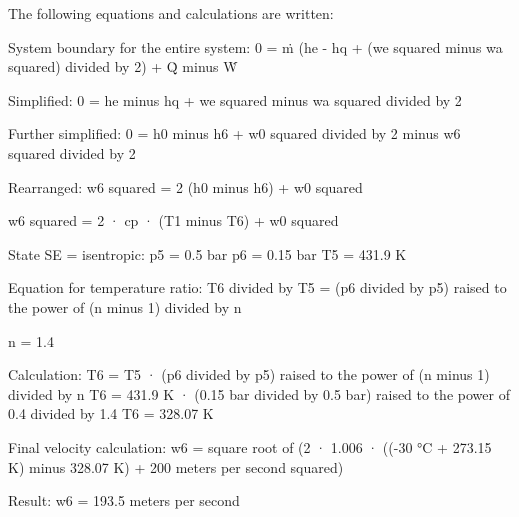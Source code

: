 The following equations and calculations are written:  

System boundary for the entire system:  
0 = ṁ (he - hq + (we squared minus wa squared) divided by 2) + Q̇ minus Ẇ  

Simplified:  
0 = he minus hq + we squared minus wa squared divided by 2  

Further simplified:  
0 = h0 minus h6 + w0 squared divided by 2 minus w6 squared divided by 2  

Rearranged:  
w6 squared = 2 (h0 minus h6) + w0 squared  

w6 squared = 2 · cp · (T1 minus T6) + w0 squared  

State SE = isentropic:  
p5 = 0.5 bar  
p6 = 0.15 bar  
T5 = 431.9 K  

Equation for temperature ratio:  
T6 divided by T5 = (p6 divided by p5) raised to the power of (n minus 1) divided by n  

n = 1.4  

Calculation:  
T6 = T5 · (p6 divided by p5) raised to the power of (n minus 1) divided by n  
T6 = 431.9 K · (0.15 bar divided by 0.5 bar) raised to the power of 0.4 divided by 1.4  
T6 = 328.07 K  

Final velocity calculation:  
w6 = square root of (2 · 1.006 · ((-30 °C + 273.15 K) minus 328.07 K) + 200 meters per second squared)  

Result:  
w6 = 193.5 meters per second